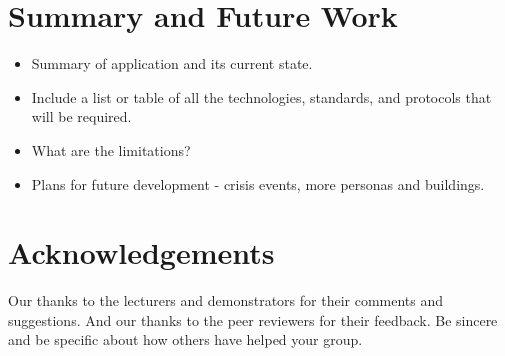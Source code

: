 \documentclass{sig-alt-release2}
\begin{document}
\section{Summary and Future Work}
\begin{itemize}

\item	Summary of application and its current state.

\item	Include a list or table of all the technologies, standards, and protocols that will be required.

\item	What are the limitations?

\item Plans for future development - crisis events, more personas and buildings.

\end{itemize}

\section{Acknowledgements}
Our thanks to the lecturers and demonstrators for their comments and suggestions. And our thanks to the peer reviewers for their feedback.
Be sincere and be specific about how others have helped your group.



\end{document}
